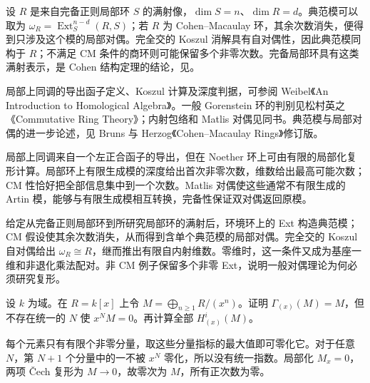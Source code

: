 \ProseParagraphBreak
设 \(R\) 是来自完备正则局部环 \(S\) 的满射像，\(\dim S=n\)、\(\dim R=d\)。典范模可以取为 \(\omega_R=\operatorname{Ext}_S^{n-d}(R,S)\)；若 \(R\) 为 Cohen–Macaulay 环，其余次数消失，便得到只涉及这个模的局部对偶。完全交的 Koszul 消解具有自对偶性，因此典范模同构于 \(R\)；不满足 CM 条件的商环则可能保留多个非零次数。完备局部环具有这类满射表示，是 Cohen 结构定理的结论，见。

\ProseParagraphBreak
局部上同调的导出函子定义、Koszul 计算及深度判据，可参阅 Weibel《An Introduction to Homological Algebra》\cite[\S 4.6, pp. 115--119]{Weibel1994HomologicalAlgebra}。一般 Gorenstein 环的判别见松村英之《Commutative Ring Theory》\cite[\S 18, Theorem 18.1, pp. 141--144]{Matsumura1989CommutativeRingTheory}；内射包络和 Matlis 对偶见同书\cite[\S 18, Theorems 18.4--18.6, pp. 145--149]{Matsumura1989CommutativeRingTheory}。典范模与局部对偶的进一步论述，见 Bruns 与 Herzog《Cohen--Macaulay Rings》修订版\cite[\S\S 3.3, 3.5]{BrunsHerzog1998CohenMacaulay}。






\begin{chaptersummary}
	局部上同调来自一个左正合函子的导出，但在 Noether 环上可由有限的局部化复形计算。局部环上有限生成模的深度给出首次非零次数，维数给出最高可能次数；CM 性恰好把全部信息集中到一个次数。Matlis 对偶使这些通常不有限生成的 Artin 模，能够与有限生成模相互转换，完备性保证双对偶返回原模。

	\ProseParagraphBreak
	给定从完备正则局部环到所研究局部环的满射后，环境环上的 Ext 构造典范模；CM 假设使其余次数消失，从而得到含单个典范模的局部对偶。完全交的 Koszul 自对偶给出 \(\omega_R\cong R\)，继而推出有限自内射维数。零维时，这一条件又成为基座一维和非退化乘法配对。非 CM 例子保留多个非零 Ext，说明一般对偶理论为何必须研究复形。
\end{chaptersummary}

\BookExercises

\begin{optionalexercise}\label{b3:ex:22-unbounded-torsion}
	设 \(k\) 为域。在 \(R=k[x]\) 上令 \(M=\bigoplus_{n\ge1}R/(x^n)\)。证明 \(\Gamma_{(x)}(M)=M\)，但不存在统一的 \(N\) 使 \(x^NM=0\)。再计算全部 \(H_{(x)}^i(M)\)。
\end{optionalexercise}
\begin{solution}
	每个元素只有有限个非零分量，取这些分量指标的最大值即可零化它。对于任意 \(N\)，第 \(N+1\) 个分量中的一不被 \(x^N\) 零化，所以没有统一指数。局部化 \(M_x=0\)，两项 Čech 复形为 \(M\to0\)，故零次为 \(M\)，所有正次数为零。
\end{solution}

